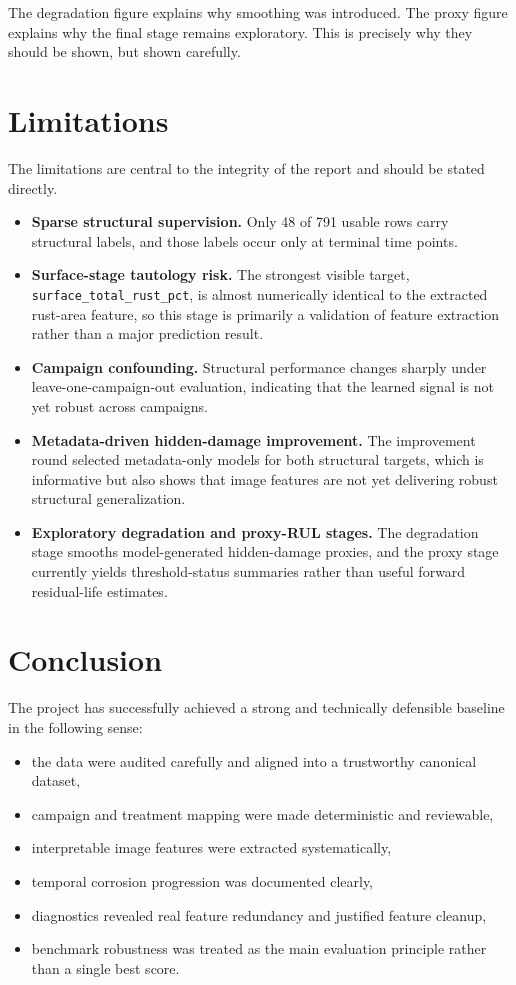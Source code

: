 \documentclass[10pt,a4paper,twocolumn]{article}
\begin{document}
The degradation figure explains why smoothing was introduced. The proxy figure explains why the final stage remains exploratory. This is precisely why they should be shown, but shown carefully.

\section{Limitations}

The limitations are central to the integrity of the report and should be stated directly.

\begin{itemize}
    \item \textbf{Sparse structural supervision.} Only 48 of 791 usable rows carry structural labels, and those labels occur only at terminal time points.
    \item \textbf{Surface-stage tautology risk.} The strongest visible target, \texttt{surface\_total\_rust\_pct}, is almost numerically identical to the extracted rust-area feature, so this stage is primarily a validation of feature extraction rather than a major prediction result.
    \item \textbf{Campaign confounding.} Structural performance changes sharply under leave-one-campaign-out evaluation, indicating that the learned signal is not yet robust across campaigns.
    \item \textbf{Metadata-driven hidden-damage improvement.} The improvement round selected metadata-only models for both structural targets, which is informative but also shows that image features are not yet delivering robust structural generalization.
    \item \textbf{Exploratory degradation and proxy-RUL stages.} The degradation stage smooths model-generated hidden-damage proxies, and the proxy stage currently yields threshold-status summaries rather than useful forward residual-life estimates.
\end{itemize}

\section{Conclusion}

The project has successfully achieved a strong and technically defensible baseline in the following sense:

\begin{itemize}
    \item the data were audited carefully and aligned into a trustworthy canonical dataset,
    \item campaign and treatment mapping were made deterministic and reviewable,
    \item interpretable image features were extracted systematically,
    \item temporal corrosion progression was documented clearly,
    \item diagnostics revealed real feature redundancy and justified feature cleanup,
    \item benchmark robustness was treated as the main evaluation principle rather than a single best score.
\end{itemize}
\end{document}
